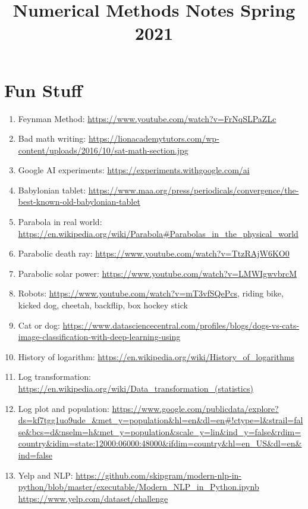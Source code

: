 \documentclass{article}
\title{Numerical Methods Notes Spring 2021}
\date
\theoremstyle{remark}
\begin{document}
\maketitle
\large

\tableofcontents

\section{Fun Stuff}

\begin{enumerate}
\item Feynman Method: \url{https://www.youtube.com/watch?v=FrNqSLPaZLc}
\item Bad math writing: \url{https://lionacademytutors.com/wp-content/uploads/2016/10/sat-math-section.jpg}
\item Google AI experiments: \url{https://experiments.withgoogle.com/ai}
\item Babylonian tablet: \url{https://www.maa.org/press/periodicals/convergence/the-best-known-old-babylonian-tablet}
\item Parabola in real world: \url{https://en.wikipedia.org/wiki/Parabola#Parabolas_in_the_physical_world}
\item Parabolic death ray: \url{https://www.youtube.com/watch?v=TtzRAjW6KO0}
\item Parabolic solar power: \url{https://www.youtube.com/watch?v=LMWIgwvbrcM}
\item Robots: \url{https://www.youtube.com/watch?v=mT3vfSQePcs}, riding bike, kicked dog, cheetah, backflip, box hockey stick
\item Cat or dog: \url{https://www.datasciencecentral.com/profiles/blogs/dogs-vs-cats-image-classification-with-deep-learning-using}
\item History of logarithm: \url{https://en.wikipedia.org/wiki/History_of_logarithms}
\item Log transformation: \url{https://en.wikipedia.org/wiki/Data_transformation_(statistics)}
\item Log plot and population: \url{https://www.google.com/publicdata/explore?ds=kf7tgg1uo9ude_&met_y=population&hl=en&dl=en#!ctype=l&strail=false&bcs=d&nselm=h&met_y=population&scale_y=lin&ind_y=false&rdim=country&idim=state:12000:06000:48000&ifdim=country&hl=en_US&dl=en&ind=false} 
\item Yelp and NLP: \url{https://github.com/skipgram/modern-nlp-in-python/blob/master/executable/Modern_NLP_in_Python.ipynb} \url{https://www.yelp.com/dataset/challenge}

\end{enumerate}
\end{document}
